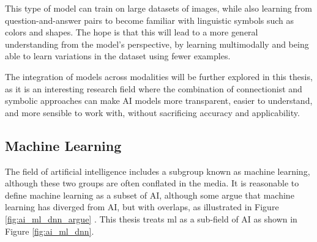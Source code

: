This type of model can train on large datasets of images, while also learning from question-and-answer pairs to become familiar with linguistic symbols such as colors and shapes. The hope is that this will lead to a more general understanding from the model's perspective, by learning multimodally and being able to learn variations in the dataset using fewer examples.

The integration of models across modalities will be further explored in this thesis, as it is an interesting research field where the combination of connectionist and symbolic approaches can make AI models more transparent, easier to understand, and more sensible to work with, without sacrificing accuracy and applicability.


    \subsection{Machine Learning}

    The field of artificial intelligence includes a subgroup known as machine learning, although these two groups are often conflated in the media. It is reasonable to define machine learning as a subset of AI, although some argue that machine learning has diverged from AI, but with overlaps, as illustrated in Figure \ref{fig:ai_ml_dnn_argue} \cite{raschkaChapterIntroductionMachine2020}. This thesis treats \gls{ml} as a sub-field of AI as shown in Figure \ref{fig:ai_ml_dnn}.


